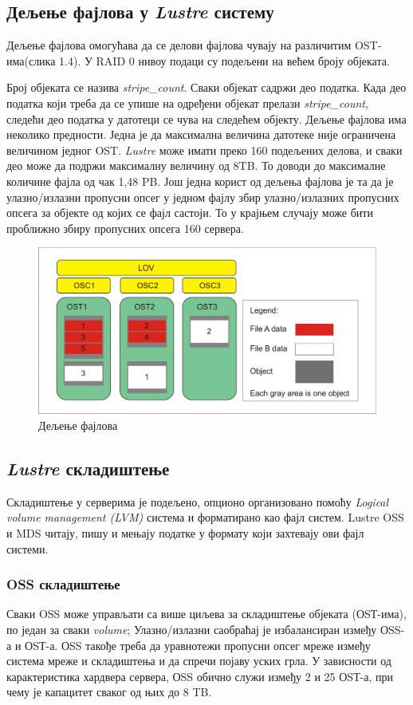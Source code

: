 \subsection{Дељење фајлова у   \textit{Lustre}  систему}
Дељење фајлова омогућава да се делови фајлова чувају на различитим OST-има(слика 1.4). 
У RAID 0 нивоу подаци су подељени на већем броју објеката.

Број објеката се назива \textit{stripe\_count}. Сваки објекат садржи део податка. Када део податка који треба да се упише на одређени објекат прелази \textit{stripe\_count}, 
следећи део податка у датотеци се чува на следећем објекту. Дељење фајлова има  неколико предности. Једна је да максимална величина датотеке није 
ограничена величином једног OST. \textit{Lustre} може имати преко 160 подељених делова, и сваки део може да подржи максималну величину од 8TB. То доводи до максималне количине фајла од чак 1,48 PB. Још једна корист од дељења фајлова је та да је улазно/излазни пропусни опсег у једном фајлу 
збир улазно/излазних пропусних опсега за објекте од којих се фајл састоји. То у крајњем случају може бити проближно збиру пропусних опсега 160 сервера.


\begin{figure}[h!]
  \centering
      \includegraphics[width=1\textwidth]{slike/lustre_striping.png}
  \caption{Дељење фајлова}
\end{figure}

\subsection{\textit{Lustre} складиштење}
Складиштење у серверима је подељено, опционо организовано помоћу \textit{Logical
volume management (LVM)} система и форматирано као фајл систем. Lustre OSS и MDS
читају, пишу и мењају податке у формату који захтевају ови фајл системи.

\subsubsection{OSS складиштење}
Сваки OSS може управљати са више циљева за складиштење објеката (ОSТ-има), по један за сваки \textit{volume};
Улазно/излазни саобраћај је  избалансиран између ОSS-а и ОSТ-а. ОSS такође  треба да уравнотежи
пропусни опсег мреже између система мреже и складиштења и да спречи појаву уских грла. У зависности од карактеристика хардвера сервера, ОSS обично служи између 2 и 25 ОSТ-а, при чему је капацитет сваког од њих до 8 TB.

